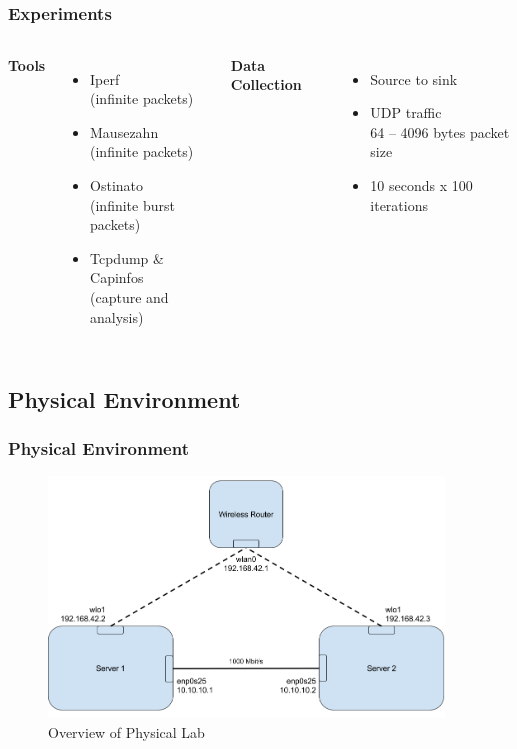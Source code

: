 \documentclass{beamer}
\begin{document}
\subsection{}
\begin{frame}
  \frametitle{Experiments}
  \begin{columns}[c] %
    \textbf{Tools}
    \begin{itemize}
      \item Iperf \\ (infinite packets)
      \item Mausezahn \\ (infinite packets)
      \item Ostinato \\ (infinite burst packets)
      \item Tcpdump \& Capinfos \\ (capture and analysis)
    \end{itemize}

    \textbf{Data Collection}
    \begin{itemize}
      \item Source to sink
      \item UDP traffic \\
        64 -- 4096 bytes packet size
      \item 10 seconds x 100 iterations
    \end{itemize}
  \end{columns}
\end{frame}

\subsection{Physical Environment}
\begin{frame}
  \frametitle{Physical Environment}
  \begin{figure}[h!]
    \centering
    \includegraphics[width=10.5cm]{../tex/figure/labenv}
    \caption{Overview of Physical Lab}
    \label{fig:labenv}
  \end{figure}
\end{frame}
\end{document}
